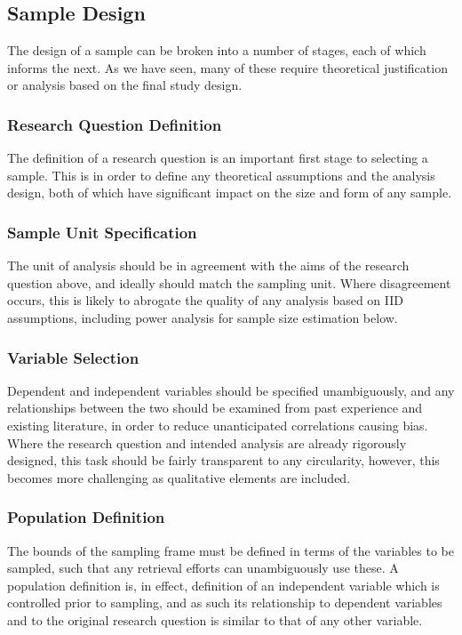 \subsection{Sample Design}
The design of a sample can be broken into a number of stages, each of which informs the next.  As we have seen, many of these require theoretical justification or analysis based on the final study design.

%

\subsubsection{Research Question Definition}
The definition of a research question is an important first stage to selecting a sample.  This is in order to define any theoretical assumptions and the analysis design, both of which have significant impact on the size and form of any sample.

\subsubsection{Sample Unit Specification}
The unit of analysis should be in agreement with the aims of the research question above, and ideally should match the sampling unit.  Where disagreement occurs, this is likely to abrogate the quality of any analysis based on IID assumptions, including power analysis for sample size estimation below.

\subsubsection{Variable Selection}
Dependent and independent variables should be specified unambiguously, and any relationships between the two should be examined from past experience and existing literature, in order to reduce unanticipated correlations causing bias.  Where the research question and intended analysis are already rigorously designed, this task should be fairly transparent to any circularity, however, this becomes more challenging as qualitative elements are included.

\subsubsection{Population Definition}
The bounds of the sampling frame must be defined in terms of the variables to be sampled, such that any retrieval efforts can unambiguously use these.  A population definition is, in effect, definition of an independent variable which is controlled prior to sampling, and as such its relationship to dependent variables and to the original research question is similar to that of any other variable.


